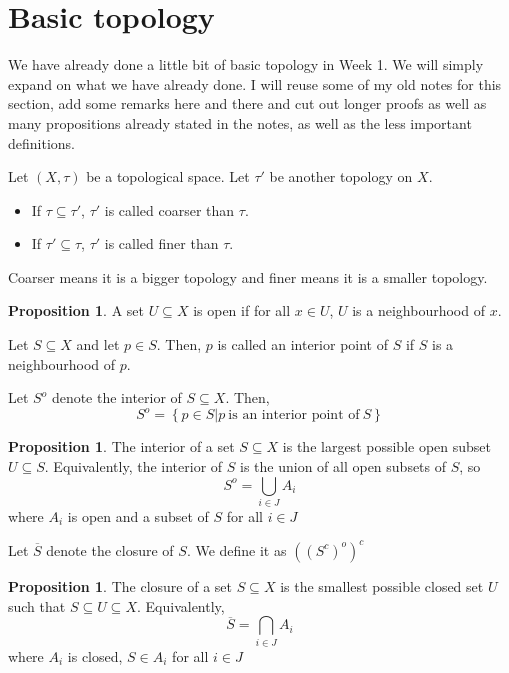 \documentclass[12pt,reqno]{amsart}
\numberwithin{theorem}{section}
\theoremstyle{definition}
\theoremstyle{remark}
\numberwithin{equation}{section}
\newcommand{\set}[1]{\left \{ #1 \right \}}
\theoremstyle{definition}
\newtheorem{prop}[theorem]{Proposition}
\begin{document}
\section{Basic topology}
We have already done a little bit of basic topology in Week 1. We will simply expand on what we have already done. I will reuse some of my old notes for this section, add some remarks here and there and cut out longer proofs as well as many propositions already stated in the notes, as well as the less important definitions.
\begin{definition}
    Let $(X,\tau)$ be a topological space. Let $\tau'$ be another topology on $X$.
    \begin{itemize}
        \item If $\tau \subseteq \tau'$, $\tau'$ is called coarser than $\tau$.
        \item If $\tau' \subseteq \tau$, $\tau'$ is called finer than $\tau$.
    \end{itemize}
\end{definition}
Coarser means it is a bigger topology and finer means it is a smaller topology.
\begin{prop}
    A set $U \subseteq X$ is open if for all $x \in U$, $U$ is a neighbourhood of $x$. 
\end{prop}
\begin{definition}
    Let $S \subseteq X$ and let $p \in S$. Then, $p$ is called an interior point of $S$ if $S$ is a neighbourhood of $p$.
\end{definition}
\begin{definition}
    Let $S^o$ denote the interior of $S\subseteq X$. Then, 
    $$S^o = \set{p \in S | p \ \text{is an interior point of} \ S}$$
\end{definition}
\begin{prop}
    The interior of a set $S \subseteq X$ is the largest possible open subset $U \subseteq S$. Equivalently, the interior of $S$ is the union of all open subsets of $S$, so
    $$S^o = \bigcup_{i \in J} A_i$$
    where $A_i$ is open and a subset of $S$ for all $i \in J$
\end{prop}
\begin{definition}
    Let $\overline S$ denote the closure of $S$. We define it as $((S^c)^o)^c$
\end{definition}
\begin{prop}
    The closure of a set $S \subseteq X$ is the smallest possible closed set $U$ such that $S \subseteq U \subseteq X$. Equivalently,
    $$\overline S = \bigcap_{i\in J} A_i$$
    where $A_i$ is closed, $S \in A_i$ for all $i \in J$
\end{prop}
\end{document}

